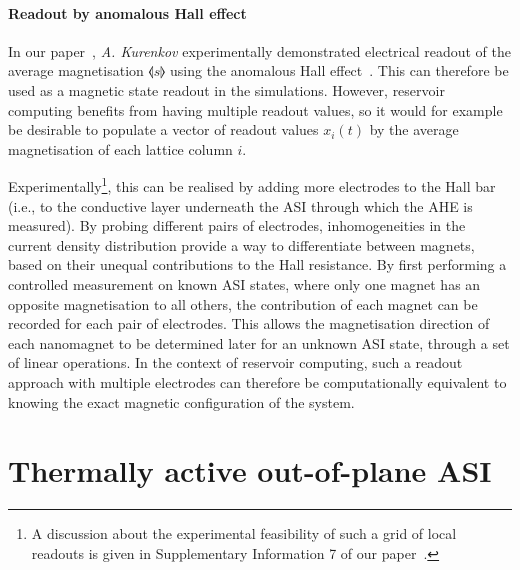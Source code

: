 \paragraph{Readout by anomalous Hall effect}
In our paper~\cite{KUR-24}, \textit{A. Kurenkov} experimentally demonstrated electrical readout of the average magnetisation $\llangle s \rrangle$ using the anomalous Hall effect~\cite{AHE}.
This can therefore be used as a magnetic state readout in the simulations.
However, reservoir computing benefits from having multiple readout values, so it would for example be desirable to populate a vector of readout values $x_i(t)$ by the average magnetisation of each lattice column $i$. \par %
Experimentally\footnote{
	A discussion about the experimental feasibility of such a grid of local readouts is given in Supplementary Information 7 of our paper~\cite{KUR-24}.
}, this can be realised by adding more electrodes to the Hall bar (i.e., to the conductive layer underneath the ASI through which the AHE is measured).
By probing different pairs of electrodes, inhomogeneities in the current density distribution provide a way to differentiate between magnets, based on their unequal contributions to the Hall resistance.
By first performing a controlled measurement on known ASI states, where only one magnet has an opposite magnetisation to all others, the contribution of each magnet can be recorded for each pair of electrodes.
This allows the magnetisation direction of each nanomagnet to be determined later for an unknown ASI state, through a set of linear operations. %
In the context of reservoir computing, such a readout approach with multiple electrodes can therefore be computationally equivalent to knowing the exact magnetic configuration of the system.

\section{Thermally active out-of-plane ASI}
